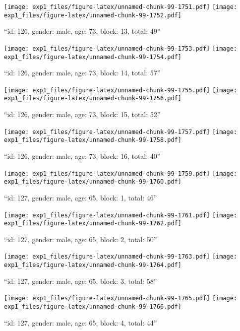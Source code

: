 \documentclass[,]{article}
\begin{document}
\texttt{[image: exp1\_files/figure-latex/unnamed-chunk-99-1751.pdf]}
\texttt{[image: exp1\_files/figure-latex/unnamed-chunk-99-1752.pdf]}

\newpage
[1] 

``id: 126, gender: male, age: 73, block: 13, total: 49''

\texttt{[image: exp1\_files/figure-latex/unnamed-chunk-99-1753.pdf]}
\texttt{[image: exp1\_files/figure-latex/unnamed-chunk-99-1754.pdf]}

\newpage
[1] 

``id: 126, gender: male, age: 73, block: 14, total: 57''

\texttt{[image: exp1\_files/figure-latex/unnamed-chunk-99-1755.pdf]}
\texttt{[image: exp1\_files/figure-latex/unnamed-chunk-99-1756.pdf]}

\newpage
[1] 

``id: 126, gender: male, age: 73, block: 15, total: 52''

\texttt{[image: exp1\_files/figure-latex/unnamed-chunk-99-1757.pdf]}
\texttt{[image: exp1\_files/figure-latex/unnamed-chunk-99-1758.pdf]}

\newpage
[1] 

``id: 126, gender: male, age: 73, block: 16, total: 40''

\texttt{[image: exp1\_files/figure-latex/unnamed-chunk-99-1759.pdf]}
\texttt{[image: exp1\_files/figure-latex/unnamed-chunk-99-1760.pdf]}

\newpage
[1] 

``id: 127, gender: male, age: 65, block: 1, total: 46''

\texttt{[image: exp1\_files/figure-latex/unnamed-chunk-99-1761.pdf]}
\texttt{[image: exp1\_files/figure-latex/unnamed-chunk-99-1762.pdf]}

\newpage
[1] 

``id: 127, gender: male, age: 65, block: 2, total: 50''

\texttt{[image: exp1\_files/figure-latex/unnamed-chunk-99-1763.pdf]}
\texttt{[image: exp1\_files/figure-latex/unnamed-chunk-99-1764.pdf]}

\newpage
[1] 

``id: 127, gender: male, age: 65, block: 3, total: 58''

\texttt{[image: exp1\_files/figure-latex/unnamed-chunk-99-1765.pdf]}
\texttt{[image: exp1\_files/figure-latex/unnamed-chunk-99-1766.pdf]}

\newpage
[1] 

``id: 127, gender: male, age: 65, block: 4, total: 44''
\end{document}
